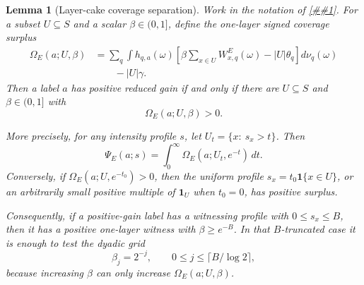 \documentclass[10pt]{article}
\newcommand{\cref}[1]{\ref{##1}}
\newtheorem{lemma}[theorem]{Lemma}
\theoremstyle{definition}
\begin{document}
\begin{lemma}[Layer-cake coverage separation]
   \label{lem:layer-cake-reduced-gain-separation}
   Work in the notation of
   \cref{lem:reduced-gain-variational-separation}.  For a subset
   \(U\subseteq S\) and a scalar \(\beta\in(0,1]\), define the one-layer
   signed coverage surplus
   \[
   \begin{aligned}
      \Omega_E(a;U,\beta)
      &=
      \sum_q
      \int
      h_{q,a}(\omega)
      \left[
         \beta\sum_{x\in U}W^E_{x,q}(\omega)
         -|U|\theta_q
      \right]d\nu_q(\omega)\\
      &\qquad - |U|\gamma .
   \end{aligned}
      \tag{LC1}
   \]
   Then a label \(a\) has positive reduced gain if and only if there are
   \(U\subseteq S\) and \(\beta\in(0,1]\) with
   \[
      \Omega_E(a;U,\beta)>0 .
      \tag{LC2}
   \]

   More precisely, for any intensity profile \(s\), let
   \(U_t=\{x:\ s_x>t\}\).  Then
   \[
      \Psi_E(a;s)
      =
      \int_0^\infty
      \Omega_E(a;U_t,e^{-t})\,dt .
      \tag{LC3}
   \]
   Conversely, if \(\Omega_E(a;U,e^{-t_0})>0\), then the uniform profile
   \(s_x=t_0\mathbf 1\{x\in U\}\), or an arbitrarily small positive multiple of
   \(\mathbf 1_U\) when \(t_0=0\), has positive surplus.

   Consequently, if a positive-gain label has a witnessing profile with
   \(0\le s_x\le B\), then it has a positive one-layer witness with
   \(\beta\ge e^{-B}\).  In that \(B\)-truncated case it is enough to test the
   dyadic grid
   \[
      \beta_j=2^{-j},
      \qquad
      0\le j\le\lceil B/\log 2\rceil,
      \tag{LC4}
   \]
   because increasing \(\beta\) can only increase \(\Omega_E(a;U,\beta)\).
\end{lemma}
\end{document}
